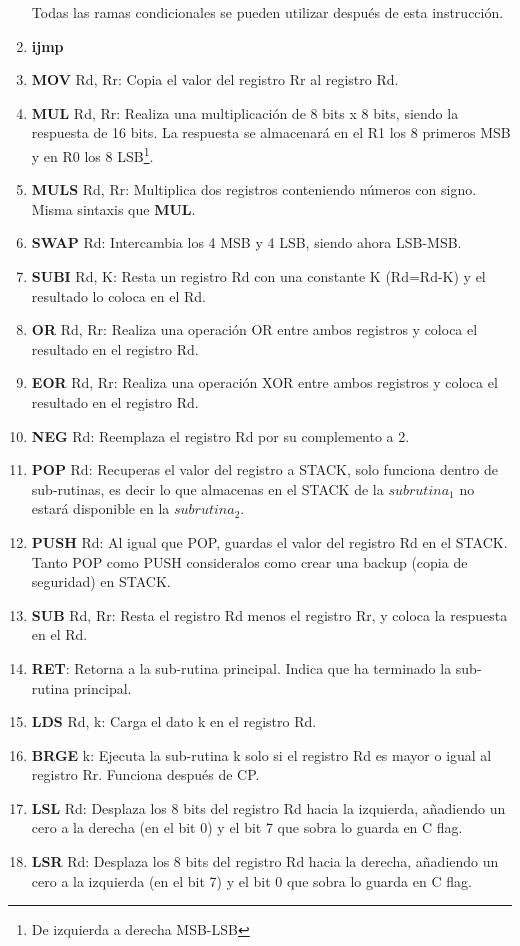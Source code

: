 \documentclass[
	12pt, %
	fleqn, %
	a4paper, %
]{LegrandOrangeBook}
\begin{document}
\begin{enumerate}
Todas las ramas condicionales se pueden utilizar después de esta instrucción.
\item \textbf{ijmp}
\item \textbf{MOV} Rd, Rr: Copia el valor del registro Rr al registro Rd.
\item \textbf{MUL} Rd, Rr: Realiza una multiplicación de 8 bits x 8 bits, siendo la respuesta de 16 bits. La respuesta se almacenará en el R1 los 8 primeros MSB y en R0 los 8 LSB\footnote{De izquierda a derecha MSB-LSB}.
\item \textbf{MULS} Rd, Rr: Multiplica dos registros conteniendo números con signo. Misma sintaxis que \textbf{MUL}.
\item \textbf{SWAP} Rd: Intercambia los 4 MSB y 4 LSB, siendo ahora LSB-MSB.
\item \textbf{SUBI} Rd, K: Resta un registro Rd con una constante K (Rd=Rd-K) y el resultado lo coloca en el Rd.
\item \textbf{OR} Rd, Rr: Realiza una operación OR entre ambos registros y coloca el resultado en el registro Rd.
\item \textbf{EOR} Rd, Rr: Realiza una operación XOR entre ambos registros y coloca el resultado en el registro Rd.
\item \textbf{NEG} Rd: Reemplaza el registro Rd por su complemento a 2.
\item \textbf{POP} Rd: Recuperas el valor del registro a STACK, solo funciona dentro de sub-rutinas, es decir lo que almacenas en el STACK de la $subrutina_1$ no estará disponible en la $subrutina_2$.
\item \textbf{PUSH} Rd: Al igual que POP, guardas el valor del registro Rd en el STACK. Tanto POP como PUSH consideralos como crear una backup (copia de seguridad) en STACK.
\item \textbf{SUB} Rd, Rr: Resta el registro Rd menos el registro Rr, y coloca la respuesta en el Rd.
\item \textbf{RET}: Retorna a la sub-rutina principal. Indica que ha terminado la sub-rutina principal.
\item \textbf{LDS} Rd, k: Carga el dato k en el registro Rd.
\item \textbf{BRGE} k: Ejecuta la sub-rutina k solo si el registro Rd es mayor o igual al registro Rr. Funciona después de CP.
\item \textbf{LSL} Rd: Desplaza los 8 bits del registro Rd hacia la izquierda, añadiendo un cero a la derecha (en el bit 0) y el bit 7 que sobra lo guarda en C flag.
\item \textbf{LSR} Rd: Desplaza los 8 bits del registro Rd hacia la derecha, añadiendo un cero a la izquierda (en el bit 7) y el bit 0 que sobra lo guarda en C flag.

\end{enumerate}
\end{document}
